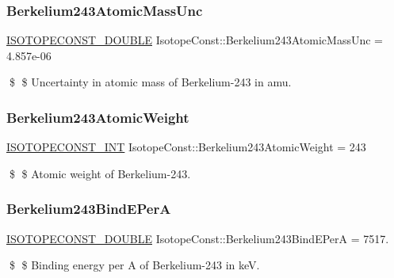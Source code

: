 \subsubsection{\texorpdfstring{Berkelium243\+Atomic\+Mass\+Unc}{Berkelium243AtomicMassUnc}}
{\footnotesize\ttfamily \mbox{\hyperlink{group___isotope_const-_macros_ga8f45a7272ce02c0b4c65c44636ed719a}{I\+S\+O\+T\+O\+P\+E\+C\+O\+N\+S\+T\+\_\+\+D\+O\+U\+B\+LE}} Isotope\+Const\+::\+Berkelium243\+Atomic\+Mass\+Unc = 4.\+857e-\/06}

\$ \$ Uncertainty in atomic mass of Berkelium-\/243 in amu. \mbox{\label{group___isotope_const-_berkelium-_bk243_ga193f8ee375580a6974476e648e61f01b}} 
\subsubsection{\texorpdfstring{Berkelium243\+Atomic\+Weight}{Berkelium243AtomicWeight}}
{\footnotesize\ttfamily \mbox{\hyperlink{group___isotope_const-_macros_ga5f18360b3e99483a35c32d789e62621c}{I\+S\+O\+T\+O\+P\+E\+C\+O\+N\+S\+T\+\_\+\+I\+NT}} Isotope\+Const\+::\+Berkelium243\+Atomic\+Weight = 243}

\$ \$ Atomic weight of Berkelium-\/243. \mbox{\label{group___isotope_const-_berkelium-_bk243_ga983efdf091ecaf7e9a083b60e50a5076}} 
\subsubsection{\texorpdfstring{Berkelium243\+Bind\+E\+PerA}{Berkelium243BindEPerA}}
{\footnotesize\ttfamily \mbox{\hyperlink{group___isotope_const-_macros_ga8f45a7272ce02c0b4c65c44636ed719a}{I\+S\+O\+T\+O\+P\+E\+C\+O\+N\+S\+T\+\_\+\+D\+O\+U\+B\+LE}} Isotope\+Const\+::\+Berkelium243\+Bind\+E\+PerA = 7517.}

\$ \$ Binding energy per A of Berkelium-\/243 in keV. \mbox{\label{group___isotope_const-_berkelium-_bk243_ga27d2a2b755698e394238c8bf50877593}} 

